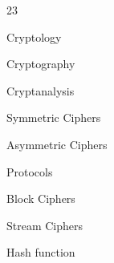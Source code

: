 \documentclass{article}
\begin{document}

23

Cryptology

Cryptography

Cryptanalysis

Symmetric Ciphers

Asymmetric Ciphers

Protocols 

Block Ciphers

Stream Ciphers

Hash function
\end{document}
